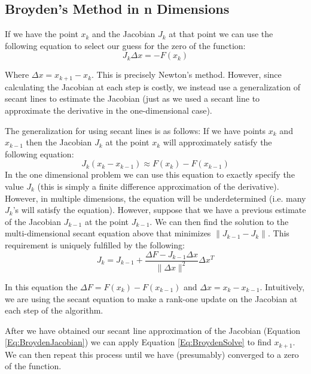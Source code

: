 \subsection*{Broyden's Method in n Dimensions}

If we have the point $x_k$ and the Jacobian $J_k$ at that point we can use the
following equation to select our guess for the zero of the function:
\begin{equation} \label{Eq:BroydenSolve}
J_k \Delta x = -F(x_k)
\end{equation}

Where $\Delta x = x_{k+1}-x_k$. This is precisely Newton's method. However, since calculating the Jacobian at each step is costly, we instead use a generalization of secant lines to estimate the Jacobian (just as we used a secant line to approximate the derivative in the one-dimensional case).

The generalization for using secant lines is as follows: If we have points $x_k$ and $x_{k-1}$ then the Jacobian $J_k$ at the point $x_k$ will approximately satisfy the following equation:
\begin{equation}
J_k (x_k-x_{k-1}) \approx F(x_k) - F(x_{k-1})
\end{equation}
In the one dimensional problem we can use this equation to exactly specify the value $J_k$ (this is simply a finite difference approximation of the derivative). However, in multiple dimensions, the equation will be underdetermined (i.e. many $J_k$'s will satisfy the equation). However, suppose that we have a previous estimate of the Jacobian $J_{k-1}$ at the point $J_{k-1}$. We can then find the solution to the multi-dimensional secant equation above that minimizes $\|J_{k-1}-J_k\|$. This requirement is uniquely fulfilled by the following:
\begin{equation} \label{Eq:BroydenJacobian}
J_k = J_{k-1} + \frac{\Delta F-J_{k-1} \Delta x}{\|\Delta x\|^2}\Delta x^T
\end{equation}

In this equation the $\Delta F = F(x_k)-F(x_{k-1})$ and $\Delta x = x_k-x_{k-1}$. Intuitively, we are using the secant equation to make a rank-one update on the Jacobian at each step of the algorithm.

After we have obtained our secant line approximation of the Jacobian (Equation \ref{Eq:BroydenJacobian}) we can apply Equation \ref{Eq:BroydenSolve} to find $x_{k+1}$. We can then repeat this process until we have (presumably) converged to a zero of the function. 

